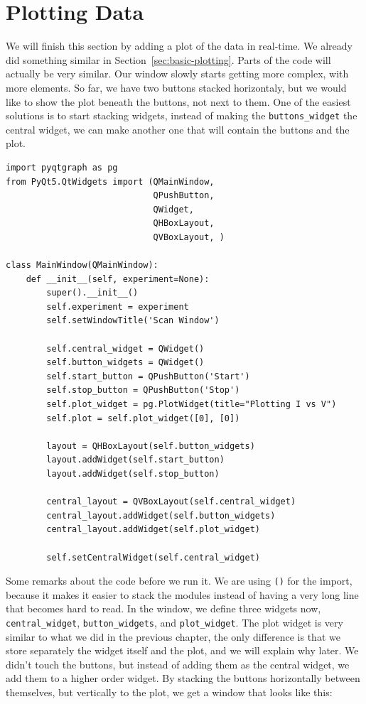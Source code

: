 

\section{Plotting Data}\label{sec:plotting-data}
We will finish this section by adding a plot of the data in real-time. We already did something similar in Section~\ref{sec:basic-plotting}. Parts of the code will actually be very similar. Our window slowly starts getting more complex, with more elements. So far, we have two buttons stacked horizontaly, but we would like to show the plot beneath the buttons, not next to them. One of the easiest solutions is to start stacking widgets, instead of making the \texttt{buttons\_widget} the central widget, we can make another one that will contain the buttons and the plot.

\begin{verbatim}
import pyqtgraph as pg
from PyQt5.QtWidgets import (QMainWindow,
                             QPushButton,
                             QWidget,
                             QHBoxLayout,
                             QVBoxLayout, )

class MainWindow(QMainWindow):
    def __init__(self, experiment=None):
        super().__init__()
        self.experiment = experiment
        self.setWindowTitle('Scan Window')

        self.central_widget = QWidget()
        self.button_widgets = QWidget()
        self.start_button = QPushButton('Start')
        self.stop_button = QPushButton('Stop')
        self.plot_widget = pg.PlotWidget(title="Plotting I vs V")
        self.plot = self.plot_widget([0], [0])

        layout = QHBoxLayout(self.button_widgets)
        layout.addWidget(self.start_button)
        layout.addWidget(self.stop_button)

        central_layout = QVBoxLayout(self.central_widget)
        central_layout.addWidget(self.button_widgets)
        central_layout.addWidget(self.plot_widget)

        self.setCentralWidget(self.central_widget)
\end{verbatim}

Some remarks about the code before we run it. We are using \texttt{()} for the import, because it makes it easier to stack the modules instead of having a very long line that becomes hard to read. In the window, we define three widgets now, \texttt{central\_widget}, \texttt{button\_widgets}, and \texttt{plot\_widget}. The plot widget is very similar to what we did in the previous chapter, the only difference is that we store separately the widget itself and the plot, and we will explain why later. We didn't touch the buttons, but instead of adding them as the central widget, we add them to a higher order widget. By stacking the buttons horizontally between themselves, but vertically to the plot, we get a window that looks like this:

